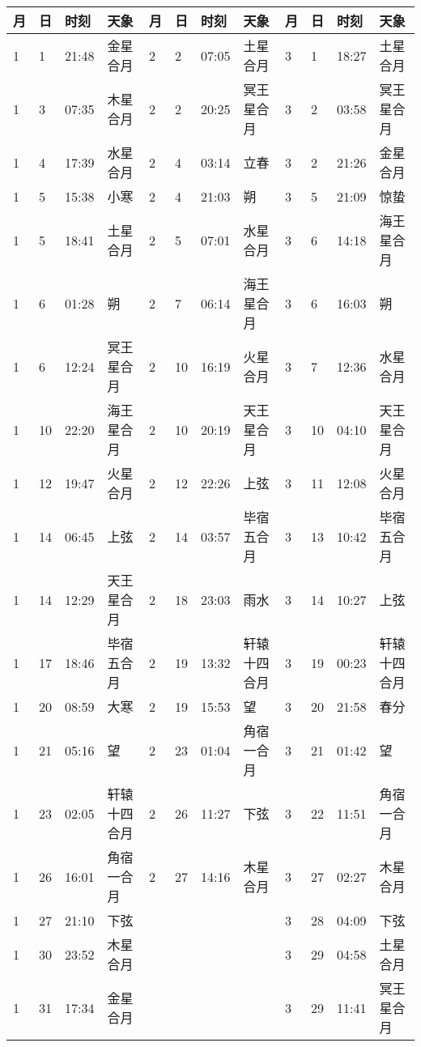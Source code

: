 
\begin{tabular}{llll|llll|llll}
\hline
	月 & 日 & 时刻 & 天象 &         %
	月 & 日 & 时刻 & 天象 &
	月 & 日 & 时刻 & 天象 \tabularnewline
\hline
1 & 1 & 21:48 & 金星合月 & 2 & 2 & 07:05 & 土星合月 & 3 & 1 & 18:27 & 土星合月 \tabularnewline
1 & 3 & 07:35 & 木星合月 & 2 & 2 & 20:25 & 冥王星合月 & 3 & 2 & 03:58 & 冥王星合月 \tabularnewline
1 & 4 & 17:39 & 水星合月 & 2 & 4 & 03:14 & 立春 & 3 & 2 & 21:26 & 金星合月 \tabularnewline
1 & 5 & 15:38 & 小寒 & 2 & 4 & 21:03 & 朔 & 3 & 5 & 21:09 & 惊蛰 \tabularnewline
1 & 5 & 18:41 & 土星合月 & 2 & 5 & 07:01 & 水星合月 & 3 & 6 & 14:18 & 海王星合月 \tabularnewline
1 & 6 & 01:28 & 朔 & 2 & 7 & 06:14 & 海王星合月 & 3 & 6 & 16:03 & 朔 \tabularnewline
1 & 6 & 12:24 & 冥王星合月 & 2 & 10 & 16:19 & 火星合月 & 3 & 7 & 12:36 & 水星合月 \tabularnewline
1 & 10 & 22:20 & 海王星合月 & 2 & 10 & 20:19 &  天王星合月 & 3 & 10 & 04:10 &  天王星合月 \tabularnewline
1 & 12 & 19:47 & 火星合月 & 2 & 12 & 22:26 & 上弦 & 3 & 11 & 12:08 & 火星合月 \tabularnewline
1 & 14 & 06:45 & 上弦 & 2 & 14 & 03:57 & 毕宿五合月 & 3 & 13 & 10:42 & 毕宿五合月 \tabularnewline
1 & 14 & 12:29 &  天王星合月 & 2 & 18 & 23:03 & 雨水 & 3 & 14 & 10:27 & 上弦 \tabularnewline
1 & 17 & 18:46 & 毕宿五合月 & 2 & 19 & 13:32 & 轩辕十四合月 & 3 & 19 & 00:23 & 轩辕十四合月 \tabularnewline
1 & 20 & 08:59 & 大寒 & 2 & 19 & 15:53 & 望 & 3 & 20 & 21:58 & 春分 \tabularnewline
1 & 21 & 05:16 & 望 & 2 & 23 & 01:04 & 角宿一合月 & 3 & 21 & 01:42 & 望 \tabularnewline
1 & 23 & 02:05 & 轩辕十四合月 & 2 & 26 & 11:27 & 下弦 & 3 & 22 & 11:51 & 角宿一合月 \tabularnewline
1 & 26 & 16:01 & 角宿一合月 & 2 & 27 & 14:16 & 木星合月 & 3 & 27 & 02:27 & 木星合月 \tabularnewline
1 & 27 & 21:10 & 下弦 &  &  &  &  & 3 & 28 & 04:09 & 下弦 \tabularnewline
1 & 30 & 23:52 & 木星合月 &  &  &  &  & 3 & 29 & 04:58 & 土星合月 \tabularnewline
1 & 31 & 17:34 & 金星合月 &  &  &  &  & 3 & 29 & 11:41 & 冥王星合月 \tabularnewline
\hline \end{tabular}

